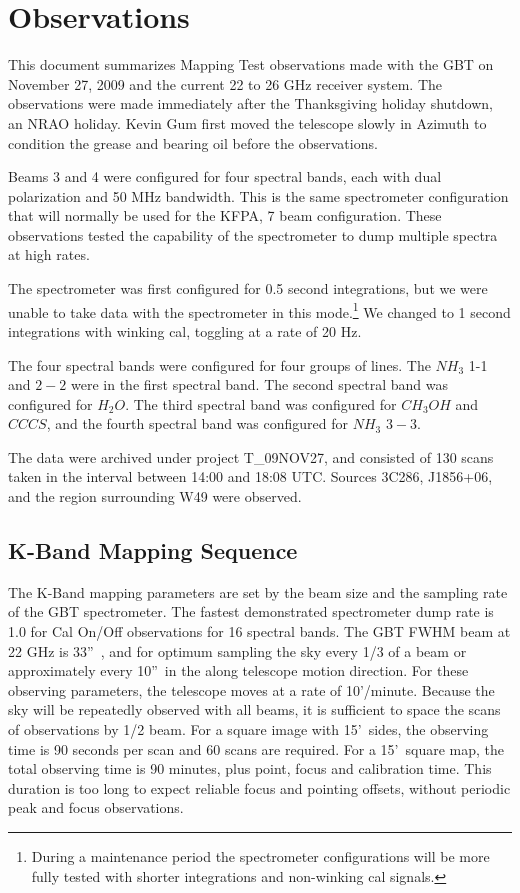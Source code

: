 \documentclass[12pt,twoside]{article}
\newcommand{\arcs}{''~}
\newcommand{\arcm}{'~}
\begin{document}
\section{Observations}

This document summarizes Mapping Test observations made with the GBT
on November 27, 2009 and the current 22 to 26 GHz receiver system.  
The observations were made immediately after the Thanksgiving
holiday shutdown, an NRAO holiday.   Kevin Gum first moved the
telescope slowly in Azimuth to condition the grease and bearing oil before
the observations.
 
Beams 3 and 4 were configured for four spectral bands, each with dual 
polarization and 50 MHz bandwidth.   This is the same spectrometer configuration
that will normally be used for the KFPA, 7 beam configuration.  
These observations tested the capability of the spectrometer
to dump multiple spectra at high rates.   

The spectrometer was first configured for 0.5 second integrations, but
we were unable to take data with the spectrometer in this mode.\footnote{During a maintenance period the spectrometer configurations will
be more fully tested with shorter integrations and non-winking cal signals.}
We changed to 1 second integrations with winking cal, toggling at a rate of 20 Hz.

The four spectral bands were configured for four groups of lines.
The $NH_3$ 1-1 and $2-2$ were in the first spectral band.
The second spectral band was configured for $H_2O$.   
The third spectral band was configured for $CH_3OH$ and $CCCS$,  and
the fourth spectral band was configured for $NH_3$ $3-3$.

The data were archived under project T\_09NOV27, and consisted of 130 scans
taken in the interval between 14:00 and 18:08 UTC.   Sources 3C286, J1856+06,
and the region surrounding W49 were observed.
 
\subsection[K-Band Mapping Sequence]{K-Band Mapping Sequence}
\bigskip

The K-Band mapping parameters are set by the beam size and the
sampling rate of the GBT spectrometer.   The fastest demonstrated
spectrometer dump rate is 1.0 for Cal On/Off observations for 16 spectral
bands.    The GBT FWHM beam at 22 GHz is 33\arcs, and for optimum sampling
the sky every 1/3 of a beam or approximately every 10\arcs in the along
telescope motion direction.
For these observing parameters, the telescope moves at a rate of 10'/minute.
Because the sky will be repeatedly observed with all beams, it is sufficient
to space the scans of observations by 1/2 beam.    
For a square image with 15\arcm sides, the observing time is 90 seconds
per scan and 60 scans are required.   For a 15\arcm square map, the total observing time is 90 minutes, plus point, focus and calibration time.   This duration is too long to expect
reliable focus and pointing offsets, without periodic peak and focus observations.
\end{document}
